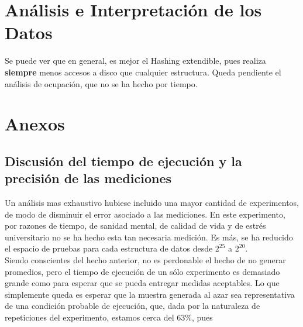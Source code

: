 \documentclass[12pt,letterpaper]{report}
\begin{document}
\newpage
\section{Análisis e Interpretación de los Datos}
Se puede ver que en general, es mejor el Hashing extendible, pues realiza \textbf{siempre} menos accesos a disco que cualquier estructura. Queda pendiente el análisis de ocupación, que no se ha hecho por tiempo.

\newpage
\section{Anexos}

\subsection{Discusión del tiempo de ejecución y la precisión de las mediciones}
Un análisis mas exhaustivo hubiese incluido una mayor cantidad de experimentos, de modo de disminuir el error asociado a las mediciones. En este experimento, por razones de tiempo, de sanidad mental, de calidad de vida y de estrés universitario no se ha hecho esta tan necesaria medición. Es más, se ha reducido el espacio de pruebas para cada estructura de datos desde $2^{25}$ a $2^{20}$.\\

Siendo conscientes del hecho anterior, no es perdonable el hecho de no generar promedios, pero el tiempo de ejecución de un sólo experimento es demasiado grande como para esperar que se pueda entregar medidas aceptables. Lo que simplemente queda es esperar que la muestra generada al azar sea representativa de una condición probable de ejecución, que, dada por la naturaleza de repeticiones del experimento, estamos cerca del $63\%$, pues 
\end{document}
